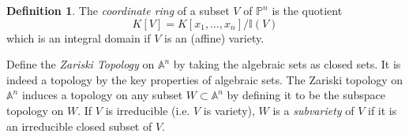\documentclass[12pt]{article}
\theoremstyle{remark}
\theoremstyle{definition}
\newtheorem{definition}{Definition}[subsection]
\newcommand{\Ac}{\mathbb{A}}   %
\newcommand{\comment}[1]{}
\begin{document}
        
        \comment{
        \subsubsection{Polynomial map}
        
        Given algebraic set $V \subset A^n(K)$, with $I(V)$ being ideal of $V$. We wish to define polynomial functions $f : V \rightarrow k$. We have mentioned that every polynomial in $K[X_1, \cdots, X_n]$ corresponds to a polynomial function. And if $F, G \in K[X_1, \cdots, X_n]$       corresponds to the same polynomial function, $F(P) = G(P) \forall P \in V$, that means $F - G       \in I(V)$. Therefore,
        $$K[V] := \{\text{polynomial functions}\} \equiv \frac{K[X_1, \cdots, X_n]}{I(V)}$$
        $K[V]$ is the \textit{coordinate ring}. There is a correspondence between $\{\text{ideals }I  \subset K[V]\}$ and $\{X \subset V\}$ given by $I \mapsto V(I)$ and $X \mapsto I(X)$.}
        
        \begin{definition}%
        The \textit{coordinate ring} of a subset $V$ of $\mathbb P^n$ is the quotient
        \[K[V]=K[x_1,\dots,x_n]/\mathbb I(V)\]
        which is an integral domain if $V$ is an (affine) variety.
        \end{definition}
        
        Define the \textit{Zariski Topology} on $\Ac^n$ by taking the algebraic sets as closed sets. It is indeed a topology by the key properties of algebraic sets. The Zariski topology on $\Ac^n$ induces a topology on any subset $W \subset \Ac^n$ by defining it to be the subspace topology on $W$. If $V$ is irreducible (i.e. $V$ is variety), $W$ is a \textit{subvariety} of $V$ if it is an irreducible closed subset of $V$. %
        
\end{document}
